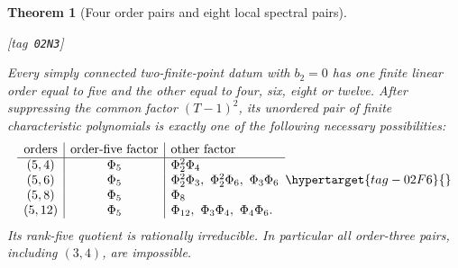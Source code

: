 \documentclass[11pt,a4paper]{article}
\numberwithin{equation}{section}
\newtheorem{theorem}{Theorem}[section]
\theoremstyle{definition}
\newcommand{\StatementRecord}[4]{{\upshape\footnotesize[tag~\texttt{#3}]}\enspace\ignorespaces}
\begin{document}
\begin{theorem}[Four order pairs and eight local spectral pairs]\hypertarget{tag-02N3}{}\label{maps:src:F.2.14}
\StatementRecord{maps:src:F.2.14}{proved}{02N3}{\cref{maps:src:F.2.15}, \cref{maps:src:F.2.9}, \cref{maps:src:F.2.7}, \eqref{maps:eq:F.40}, \cref{maps:src:F.2.2}, \cref{night:P1.11}}


Every simply connected two-finite-point datum with $b_2=0$ has
one finite linear order equal to five and the other equal
to four, six, eight or twelve.
After suppressing the common factor $(T-1)^2$, its unordered
pair of finite characteristic polynomials is exactly one
of the following necessary possibilities:
\begin{equation}
\begin{array}{c|c|l}
 \text{orders}&\text{order-five factor}&\text{other factor}\\\hline
 (5,4)&\Phi_5&\Phi_2^2\Phi_4\\
 (5,6)&\Phi_5&\Phi_2^2\Phi_3,\ \Phi_2^2\Phi_6,\ \Phi_3\Phi_6\\
 (5,8)&\Phi_5&\Phi_8\\
 (5,12)&\Phi_5&\Phi_{12},\ \Phi_3\Phi_4,\ \Phi_4\Phi_6.
\end{array}
 \hypertarget{tag-02F6}{}\label{maps:eq:F.39}
\end{equation}
Its rank-five quotient is rationally irreducible.
In particular all order-three pairs, including $(3,4)$,
are impossible.

\end{theorem}
\end{document}
